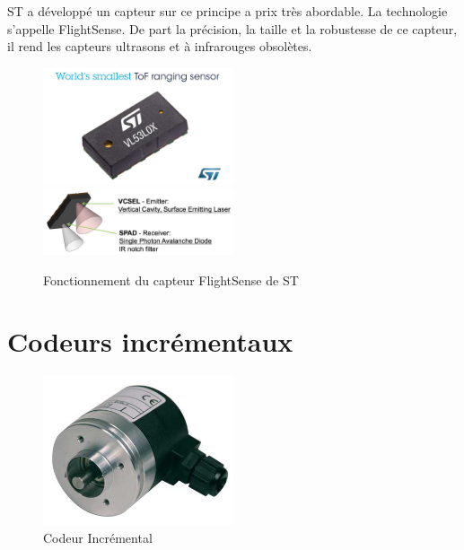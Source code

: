 \documentclass[a4paper, 11pt]{report}
\begin{document}
ST a développé un capteur sur ce principe a prix très abordable. La technologie s'appelle FlightSense. De part la précision, la taille et la robustesse de ce capteur, il rend les capteurs ultrasons et à infrarouges obsolètes.

\begin{figure}[h!]
\begin{centering}
\includegraphics[width=0.5\textwidth]{images/tofSensorST.jpg}
\includegraphics[width=0.5\textwidth]{images/principeFlightSense.jpg}
\caption{Fonctionnement du capteur FlightSense de ST}
\par\end{centering}
\end{figure}

\section{Codeurs incrémentaux}

\begin{figure}[h!]
\begin{centering}
\includegraphics[width=0.5\textwidth]{images/photoCodeurIncremental.JPG}
\caption{Codeur Incrémental}
\par\end{centering}
\end{figure}
\end{document}
